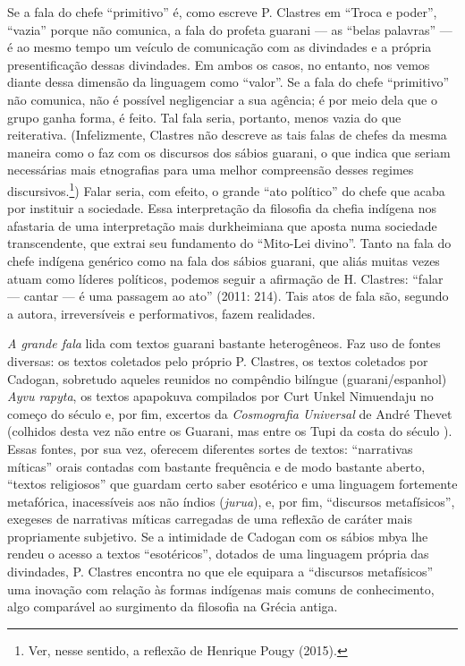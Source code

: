 {{Se a fala do chefe ``primitivo'' é, como escreve P. Clastres em ``Troca e
poder'', ``vazia'' porque não comunica, a fala do profeta guarani --- as
``belas palavras'' --- é ao mesmo tempo um veículo de comunicação com as
divindades e a própria presentificação dessas divindades. Em ambos os
casos, no entanto, nos vemos diante dessa dimensão da linguagem como
``valor''. Se a fala do chefe ``primitivo'' não comunica, não é possível
negligenciar a sua agência; é por meio dela que o grupo ganha forma, é
feito. Tal fala seria, portanto, menos vazia do que reiterativa.
(Infelizmente, Clastres não descreve as tais falas de chefes da mesma
maneira como o faz com os discursos dos sábios guarani, o que indica
que seriam necessárias mais etnografias para uma melhor compreensão
desses regimes discursivos.\footnote{Ver, nesse sentido, a reflexão de
Henrique Pougy (2015).}) Falar seria, com efeito, o grande ``ato
político'' do chefe que acaba por instituir a sociedade. Essa
interpretação da filosofia da chefia indígena nos afastaria de uma
interpretação mais durkheimiana que aposta numa sociedade
transcendente, que extrai seu fundamento do ``Mito-Lei divino''. Tanto na
fala do chefe indígena genérico como na fala dos sábios guarani, que
aliás muitas vezes atuam como líderes políticos, podemos seguir a
afirmação de H. Clastres: ``falar --- cantar --- é uma passagem ao ato''
(2011: 214). Tais atos de fala são, segundo a autora, irreversíveis e
performativos, fazem realidades. 

\emph{A grande fala} lida com textos guarani bastante heterogêneos. Faz uso de
fontes diversas: os textos coletados pelo próprio P. Clastres, os
textos coletados por Cadogan, sobretudo aqueles reunidos no compêndio
bilíngue (guarani/espanhol) \emph{Ayvu rapyta}, os textos apapokuva compilados
por Curt Unkel Nimuendaju no começo do século  e, por fim, excertos
da \emph{Cosmografia Universal} de André Thevet (colhidos desta vez não entre
os Guarani, mas entre os Tupi da costa do século ). Essas fontes,
por sua vez, oferecem diferentes sortes de textos: ``narrativas míticas''
orais contadas com bastante frequência e de modo bastante aberto,
``textos religiosos'' que guardam certo saber esotérico e uma linguagem
fortemente metafórica, inacessíveis aos não índios (\emph{jurua}), e, por fim,
``discursos metafísicos'', exegeses de narrativas míticas carregadas de
uma reflexão de caráter mais propriamente subjetivo. Se a intimidade de
Cadogan com os sábios mbya lhe rendeu o acesso a textos ``esotéricos'',
dotados de uma linguagem própria das divindades, P. Clastres encontra
no que ele equipara a ``discursos metafísicos'' uma inovação com relação
às formas indígenas mais comuns de conhecimento, algo comparável ao
surgimento da filosofia na Grécia antiga.

}}
